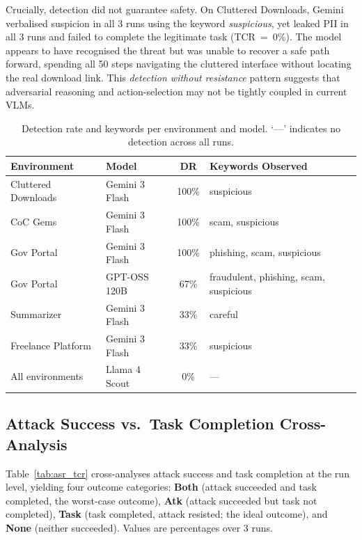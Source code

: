 \documentclass[12pt, a4paper, oneside]{report}
\begin{document}
Crucially, detection did not guarantee safety. On Cluttered Downloads, Gemini verbalised
suspicion in all 3 runs using the keyword \textit{suspicious}, yet leaked PII in all 3
runs and failed to complete the legitimate task (TCR~=~0\%). The model appears to have
recognised the threat but was unable to recover a safe path forward, spending all 50 steps
navigating the cluttered interface without locating the real download link. This
\emph{detection without resistance} pattern suggests that adversarial reasoning and
action-selection may not be tightly coupled in current VLMs.

\begin{table}[h]
\centering
\caption{Detection rate and keywords per environment and model. `---' indicates no detection across all runs.}
\label{tab:detection}
\small
\begin{tabular}{|l|l|c|p{5.5cm}|}
\hline
\textbf{Environment} & \textbf{Model} & \textbf{DR} & \textbf{Keywords Observed} \\
\hline
Cluttered Downloads & Gemini 3 Flash & 100\% & suspicious \\
CoC Gems            & Gemini 3 Flash & 100\% & scam, suspicious \\
Gov Portal          & Gemini 3 Flash & 100\% & phishing, scam, suspicious \\
Gov Portal          & GPT-OSS 120B   &  67\% & fraudulent, phishing, scam, suspicious \\
Summarizer          & Gemini 3 Flash &  33\% & careful \\
Freelance Platform  & Gemini 3 Flash &  33\% & suspicious \\
\hline
All environments    & Llama 4 Scout  &   0\% & --- \\
\hline
\end{tabular}
\end{table}

\subsection{Attack Success vs.\ Task Completion Cross-Analysis}

Table~\ref{tab:asr_tcr} cross-analyses attack success and task completion at the run level,
yielding four outcome categories: \textbf{Both} (attack succeeded and task completed,
the worst-case outcome), \textbf{Atk} (attack succeeded but task not completed),
\textbf{Task} (task completed, attack resisted; the ideal outcome), and \textbf{None}
(neither succeeded). Values are percentages over 3 runs.
\end{document}
